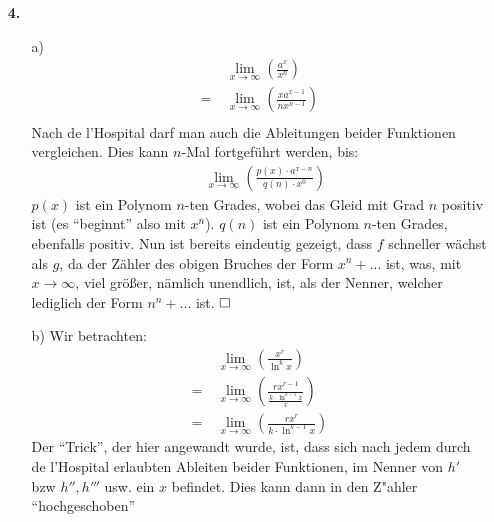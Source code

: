 \documentclass[a4paper,11pt]{article}
\begin{document}
\begin{enumerate}
        \item[\textbf{4.}]
            \begin{enumerate}
                \item[a)]
                    \begin{align*}
                        &\underset{x \to \infty}{\lim} \left( \frac{a^x}{x^n} \right)\\
                        =\ &\underset{x \to \infty}{\lim} \left( \frac{xa^{x-1}}{nx^{n-1}} \right)\\
                    \end{align*}
                    Nach de l'Hospital darf man auch die Ableitungen beider Funktionen vergleichen. Dies kann $n$-Mal fortgeführt
                    werden, bis:
                    \begin{align*}
                        &\underset{x \to \infty}{\lim} \left( \frac{p(x) \cdot a^{x-n}}{q(n) \cdot x^0} \right)
                    \end{align*}
                    $p(x)$  ist ein Polynom $n$-ten Grades, wobei das Gleid mit Grad $n$ positiv ist (es ``beginnt'' also mit $x^n$).
                    $q(n)$ ist ein Polynom $n$-ten Grades, ebenfalls positiv. Nun ist bereits eindeutig gezeigt, dass $f$ schneller wächst
                    als $g$, da der Zähler des obigen Bruches der Form $x^n+...$ ist, was, mit $x \to \infty$, viel größer, nämlich unendlich, ist,
                    als der Nenner, welcher lediglich der Form $n^n+...$ ist. $\qed$
                \item[b)]
                    Wir betrachten:
                    \begin{align*}
                        &\underset{x \to \infty}{\lim} \left( \frac{x^r}{\ln^k x} \right)\\
                        =\ &\underset{x \to \infty}{\lim} \left( \frac{rx^{r-1}}{\frac{k \cdot \ln^{k-1}x}{x}} \right)\\
                        =\ &\underset{x \to \infty}{\lim} \left( \frac{rx^{r}}{k \cdot \ln^{k-1}x} \right)
                    \end{align*}
                    Der ``Trick'', der hier angewandt wurde, ist, dass sich nach jedem durch de l'Hospital erlaubten Ableiten
                    beider Funktionen, im Nenner von $h'$ bzw $h'', h'''$ usw. ein $x$ befindet. Dies kann dann in den Z"ahler ``hochgeschoben''

\end{enumerate}
\end{enumerate}
\end{document}
